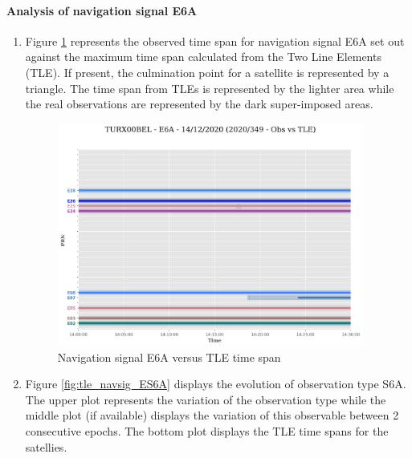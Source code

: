 \paragraph{Analysis of navigation signal E6A}%
\label{para:AnalysisofnavigationsignalE6A}%
\begin{enumerate}%
\item%
Figure \ref{fig:tle_navsig_6AE} represents the observed time span for navigation signal E6A set out against the maximum time span calculated from the  Two Line Elements (TLE). If present, the culmination point for a satellite is represented by a triangle. The time span from TLEs is represented by the lighter area while the real observations are represented by the dark super-imposed areas.%


\begin{figure}[H]%
\centering%
\includegraphics[width=0.95\textwidth]{png/TURX00BEL_R_20203491400_30M_01S_MO_E-E6A-TLE-arcs.png}%
\caption{\label{fig:tle_navsig_6AE} Navigation signal E6A versus TLE time span}%
\end{figure}

%
\item%
Figure \ref{fig:tle_navsig_ES6A} displays the evolution of observation type S6A. \newline The upper plot represents the variation of the observation type while the middle plot (if available) displays the variation of this observable between 2 consecutive epochs. The bottom plot displays the TLE time spans for the satellies.%



\end{enumerate}
